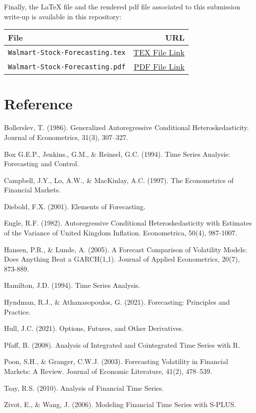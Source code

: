 \documentclass{article}
\newcommand{\1}{\mathbbm{1}}
\theoremstyle{definition}
\begin{document}
Finally, the LaTeX file and the rendered pdf file associated to this submission write-up is available in this repository:

\begin{table}[H]
\centering
\begin{tabular}{l|r}
\hline
\textbf{File}  & \textbf{URL} \\
\hline
\texttt{Walmart-Stock-Forecasting.tex} & \href{https://github.com/Stochastic1017/Walmart-Stock-Forecasting/blob/main/Write-Up/Walmart-Stock-Forecasting.tex}{TEX File Link} \\
\texttt{Walmart-Stock-Forecasting.pdf} & \href{https://github.com/Stochastic1017/Walmart-Stock-Forecasting/blob/main/Write-Up/Walmart_Stock_Forecasting.pdf}{PDF File Link} \\
\hline
\end{tabular}
\end{table}







\newpage
\section*{Reference}

Bollerslev, T. (1986). Generalized Autoregressive Conditional Heteroskedasticity.
Journal of Econometrics, 31(3), 307–327.

Box G.E.P., Jenkins., G.M., \& Reinsel, G.C. (1994). Time Series Analysis: Forecasting and Control.

Campbell, J.Y., Lo, A.W., \& MacKinlay, A.C. (1997). The Econometrics of Financial Markets.

Diebold, F.X. (2001). Elements of Forecasting.

Engle, R.F. (1982). Autoregressive Conditional Heteroskedasticity with Estimates of the Variance of United Kingdom Inflation. Econometrica, 50(4), 987-1007.

Hansen, P.R., \& Lunde, A. (2005). A Forecast Comparison of Volatility Models: Does Anything Beat a GARCH(1,1). Journal of Applied Econometrics, 20(7), 873-889.

Hamilton, J.D. (1994). Time Series Analysis.

Hyndman, R.J., \& Athanasopoulos, G. (2021). Forecasting: Principles and Practice.

Hull, J.C. (2021). Options, Futures, and Other Derivatives.

Pfaff, B. (2008). Analysis of Integrated and Cointegrated Time Series with R.

Poon, S.H., \& Granger, C.W.J. (2003). Forecasting Volatility in Financial Markets: A Review.
Journal of Economic Literature, 41(2), 478–539.

Tsay, R.S. (2010). Analysis of Financial Time Series.

Zivot, E., \& Wang, J. (2006). Modeling Financial Time Series with S-PLUS.
\end{document}
